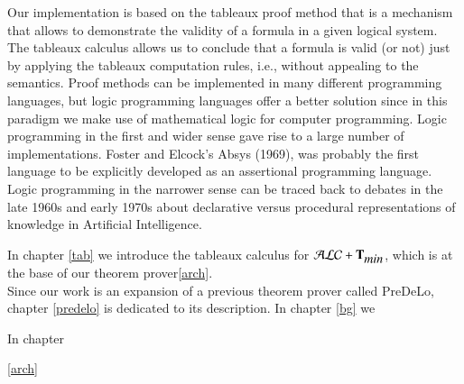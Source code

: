 \documentclass[a4paper, 11pt, oneside]{elsarticle}
\newcommand{\tip}{{\bf T}}
\newcommand{\alctmin}{\mathcal{ALC}+\tip_{\mbox{\em min}}}
\begin{document}
Our implementation is based on the tableaux proof method that is a mechanism that allows to demonstrate the validity of a formula in a given logical system.
The tableaux calculus allows us to conclude that a formula is valid (or not) just by applying the tableaux computation rules, i.e., without appealing to the semantics.
Proof methods can be implemented in many different programming languages, but logic programming languages offer a better solution since in this paradigm we make use of mathematical logic for computer programming.
Logic programming in the first and wider sense gave rise to a large number of implementations. Foster and Elcock’s Absys (1969), was probably the first language to be explicitly developed as an assertional programming language. Logic programming in the narrower sense can be traced back to debates in the late 1960s and early 1970s about declarative versus procedural representations of knowledge in Artificial Intelligence.

In chapter \ref{tab} we introduce the tableaux calculus for $\alctmin$, which is at the base of our theorem prover\ref{arch}.\\

Since our work is an expansion of a previous theorem prover called PreDeLo, chapter \ref{predelo} is dedicated to its description. In chapter \ref{bg} we 

In chapter 


\ref{arch}\\

\end{document}
